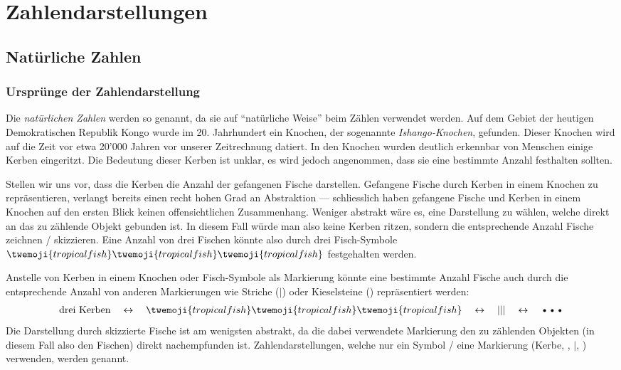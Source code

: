 \chapter{Zahlendarstellungen}

\section{Natürliche Zahlen}

\subsection{Ursprünge der Zahlendarstellung}
Die \textit{natürlichen Zahlen} werden so genannt, da sie auf \enquote{natürliche Weise} beim Zählen verwendet werden.
Auf dem Gebiet der heutigen Demokratischen Republik Kongo wurde im 20. Jahrhundert ein Knochen, der sogenannte \textit{Ishango-Knochen}, gefunden.
Dieser Knochen wird auf die Zeit vor etwa 20'000 Jahren vor unserer Zeitrechnung datiert.
In den Knochen wurden deutlich erkennbar von Menschen einige Kerben eingeritzt.
Die Bedeutung dieser Kerben ist unklar, es wird jedoch angenommen, dass sie eine bestimmte Anzahl festhalten sollten.

Stellen wir uns vor, dass die Kerben die Anzahl der gefangenen Fische darstellen.
Gefangene Fische durch Kerben in einem Knochen zu repräsentieren, verlangt bereits einen recht hohen Grad an
Abstraktion --- schliesslich haben gefangene Fische und Kerben in einem Knochen auf den ersten Blick keinen offensichtlichen Zusammenhang.
Weniger abstrakt wäre es, eine Darstellung zu wählen, welche direkt an das zu zählende Objekt gebunden ist.
In diesem Fall würde man also keine Kerben ritzen, sondern die entsprechende Anzahl Fische zeichnen / skizzieren.
Eine Anzahl von drei Fischen könnte also durch drei Fisch-Symbole $\twemoji{tropical fish}\twemoji{tropical fish}\twemoji{tropical fish}$
festgehalten werden.

Anstelle von Kerben in einem Knochen oder Fisch-Symbole als Markierung könnte eine bestimmte Anzahl Fische auch durch
die entsprechende Anzahl von anderen Markierungen wie Striche ($|$) oder Kieselsteine (\textbullet) repräsentiert werden:
\begin{align*}
	\text{drei Kerben} \quad\leftrightarrow\quad \twemoji{tropical fish}\twemoji{tropical fish}\twemoji{tropical fish} \quad\leftrightarrow\quad |||
	\quad\leftrightarrow\quad \text{\textbullet\textbullet\textbullet}
\end{align*}
Die Darstellung durch skizzierte Fische ist am wenigsten abstrakt, da die dabei verwendete Markierung den zu zählenden Objekten (in diesem Fall also den Fischen) direkt nachempfunden ist.
Zahlendarstellungen, welche nur ein Symbol / eine Markierung (Kerbe, , $|$, \textbullet) verwenden, werden
 genannt.

